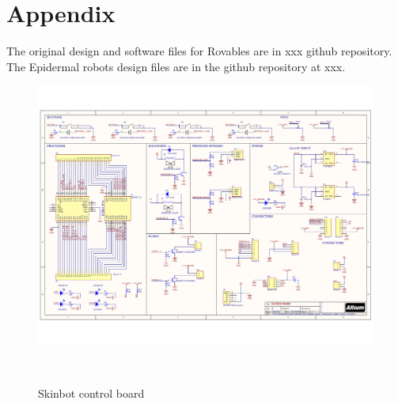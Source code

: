 \chapter{Appendix}
The original design and software files for Rovables are in xxx github repository. The Epidermal robots design files are in the github repository at xxx.


\begin{figure}[t]
\centering
  \centerline{\includegraphics[angle=90,origin=c, width=0.8\paperwidth]{pictures/appendix/Schematic_skinbot_master_v4.pdf}}
  \caption{Skinbot control board}~\label{fig:speaker}
\end{figure}


